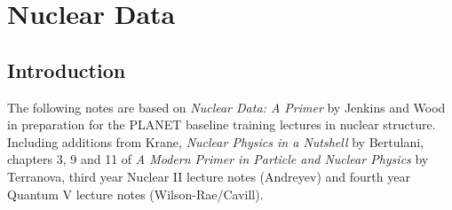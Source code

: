 \chapter{Nuclear Data}

\label{nucdat}
\section{Introduction}
The following notes are based on \textit{Nuclear Data: A Primer} by Jenkins and Wood in preparation for the PLANET baseline training lectures in nuclear structure. Including additions from Krane, \textit{Nuclear Physics in a Nutshell} by Bertulani, chapters 3, 9 and 11 of \textit{A Modern Primer in Particle and Nuclear Physics} by Terranova, third year Nuclear II lecture notes (Andreyev) and fourth year Quantum V lecture notes (Wilson-Rae/Cavill).

